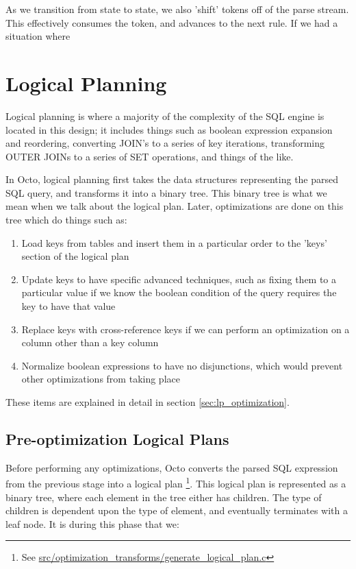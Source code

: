 \documentclass[]{article}
\newcommand{\gitlab}[1]{\footnote{See \href{https://gitlab.com/YottaDB/DBMS/YDBOcto/blob/master/#1}{#1}}}
\begin{document}
As we transition from state to state, we also 'shift' tokens off of the parse stream.
This effectively consumes the token, and advances to the next rule.
If we had a situation where 


\section{Logical Planning}

Logical planning is where a majority of the complexity of the SQL engine is located in this design; it includes things such as boolean expression expansion and reordering, converting JOIN's to a series of key iterations, transforming OUTER JOINs to a series of SET operations, and things of the like.

In Octo, logical planning first takes the data structures representing the parsed SQL query, and transforms it into a binary tree.
This binary tree is what we mean when we talk about the logical plan.
Later, optimizations are done on this tree which do things such as:

\begin{enumerate}
	\item Load keys from tables and insert them in a particular order to the 'keys' section of the logical plan
	\item Update keys to have specific advanced techniques, such as fixing them to a particular value if we know the boolean condition of the query requires the key to have that value
	\item Replace keys with cross-reference keys if we can perform an optimization on a column other than a key column
	\item Normalize boolean expressions to have no disjunctions, which would prevent other optimizations from taking place
\end{enumerate}

These items are explained in detail in section \ref{sec:lp_optimization}.

\subsection{Pre-optimization Logical Plans}

Before performing any optimizations, Octo converts the parsed SQL expression from the previous stage into a logical plan \gitlab{src/optimization\_transforms/generate\_logical\_plan.c}.
This logical plan is represented as a binary tree, where each element in the tree either has children. The type of children is dependent upon the type of element, and eventually terminates with a leaf node.
It is during this phase that we:
\end{document}
